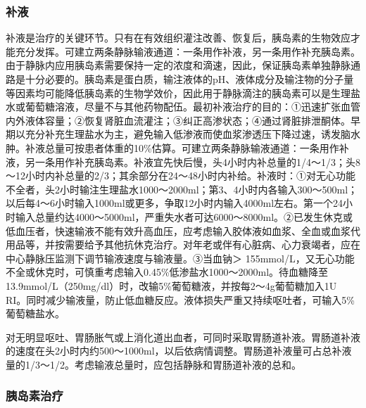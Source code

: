 \subsubsection{补液}

补液是治疗的关键环节。只有在有效组织灌注改善、恢复后，胰岛素的生物效应才能充分发挥。可建立两条静脉输液通道：一条用作补液，另一条用作补充胰岛素。由于静脉内应用胰岛素需要保持一定的浓度和滴速，因此，保证胰岛素单独静脉通路是十分必要的。胰岛素是蛋白质，输注液体的pH、液体成分及输注物的分子量等因素均可能降低胰岛素的生物学效价，因此用于静脉滴注的胰岛素可以是生理盐水或葡萄糖溶液，尽量不与其他药物配伍。最初补液治疗的目的：①迅速扩张血管内外液体容量；②恢复肾脏血流灌注；③纠正高渗状态；④通过肾脏排泄酮体。早期以充分补充生理盐水为主，避免输入低渗液而使血浆渗透压下降过速，诱发脑水肿。补液总量可按患者体重的10\%估算。可建立两条静脉输液通道：一条用作补液，另一条用作补充胰岛素。补液宜先快后慢，头4小时内补总量的1/4～1/3；头8～12小时内补总量的2/3；其余部分在24～48小时内补给。补液时：①对无心功能不全者，头2小时输注生理盐水1000～2000ml；第3、4小时内各输入300～500ml；以后每4～6小时输入1000ml或更多，争取12小时内输入4000ml左右。第一个24小时输入总量约达4000～5000ml，严重失水者可达6000～8000ml。②已发生休克或低血压者，快速输液不能有效升高血压，应考虑输入胶体液如血浆、全血或血浆代用品等，并按需要给予其他抗休克治疗。对年老或伴有心脏病、心力衰竭者，应在中心静脉压监测下调节输液速度与输液量。③当血钠＞
155mmol/L，又无心功能不全或休克时，可慎重考虑输入0.45\%低渗盐水1000～2000ml。待血糖降至13.9mmol/L（250mg/dl）时，改输5\%葡萄糖液，并按每2～4g葡萄糖加入1U
RI。同时减少输液量，防止低血糖反应。液体损失严重又持续呕吐者，可输入5\%葡萄糖盐水。

对无明显呕吐、胃肠胀气或上消化道出血者，可同时采取胃肠道补液。胃肠道补液的速度在头2小时内约500～1000ml，以后依病情调整。胃肠道补液量可占总补液量的1/3～1/2。考虑输液总量时，应包括静脉和胃肠道补液的总和。

\subsubsection{胰岛素治疗}

